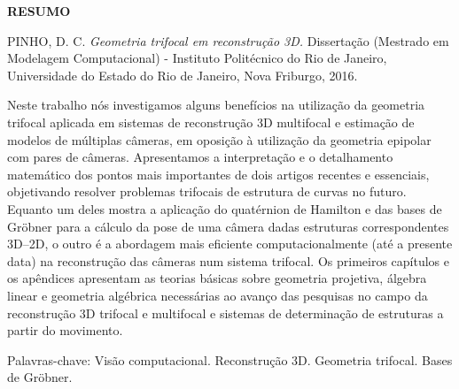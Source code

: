 \begin{center}
{\bf RESUMO}
\end{center}

\vspace{1 cm}

\begin{center}
\begin{minipage}{1\textwidth}
\noindent PINHO, D. C. {\it Geometria trifocal em reconstrução 3D.} Dissertação (Mestrado em Modelagem Computacional) - Instituto Politécnico do Rio de Janeiro, Universidade do Estado do Rio de Janeiro, Nova Friburgo, 2016.
\end{minipage}
\end{center}

\vspace{1 cm}

\begin{center}
\begin{minipage}{1\textwidth}
\qquad Neste trabalho nós investigamos alguns benefícios na utilização da geometria trifocal aplicada em sistemas de reconstrução 3D multifocal e estimação de modelos de múltiplas câmeras, em oposição à utilização da geometria epipolar com pares de câmeras. Apresentamos a interpretação e o detalhamento matemático dos pontos mais importantes de dois artigos recentes e essenciais, objetivando resolver problemas trifocais de estrutura de curvas no futuro. Equanto um deles mostra a aplicação do quatérnion de Hamilton e das bases de Gr\"obner para a cálculo da pose de uma câmera dadas estruturas correspondentes 3D--2D, o outro é a abordagem mais eficiente computacionalmente (até a presente data) na reconstrução das câmeras num sistema trifocal. Os primeiros capítulos e os apêndices apresentam as teorias básicas sobre geometria projetiva, álgebra linear e geometria algébrica necessárias ao avanço das pesquisas no campo da reconstrução 3D trifocal e multifocal e sistemas de determinação de estruturas a partir do movimento.
\end{minipage}
\end{center}
 
\vspace{1 cm}

\begin{flushleft}
Palavras-chave: Visão computacional. Reconstrução 3D. Geometria trifocal. Bases de Gr\"obner. 
\end{flushleft}

\newpage
